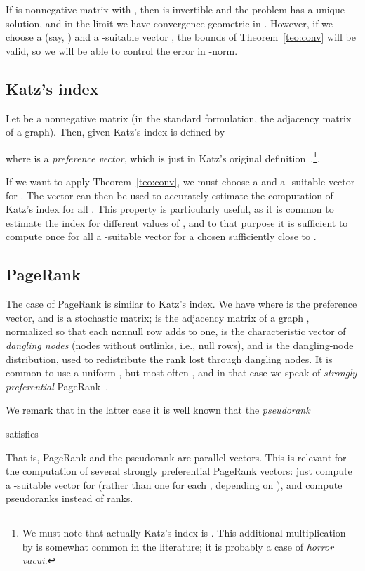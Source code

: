 \documentclass{article}
\newcommand{\1}{\mathbf 1}
\begin{document}
If  is nonnegative matrix with , then  is invertible and the 
problem  has a unique solution, and in the limit we have
convergence geometric in . However, if we choose a
 (say, ) and a -suitable vector , the bounds of
Theorem~\ref{teo:conv} will be valid, so we will be
able to control the error in -norm.

\subsection{Katz's index}

Let  be a nonnegative matrix (in the standard formulation, the adjacency
matrix of a graph). Then, given  Katz's index is defined by

where  is a \emph{preference vector}, which is just  in Katz's
original definition~\cite{KatNSIDSA}.\footnote{We must note that actually Katz's index is 
. This additional multiplication by
 is somewhat common in the literature; it is probably a case of
\textit{horror vacui}.}.

If we want to apply Theorem~\ref{teo:conv}, we must choose a 
and a -suitable vector  for . The vector can then be used to
accurately estimate the computation of Katz's index for all
. This property is particularly useful, as it is common to
estimate the index for different values of , and to that purpose it is
sufficient to compute once for all a -suitable vector for  
a  chosen sufficiently close to .

\subsection{PageRank} The case of PageRank is similar to Katz's index. We have
 where  is the preference vector, and
 is a stochastic matrix;  is the adjacency matrix
of a graph , normalized so that each nonnull row adds to one,  is the
characteristic vector of \emph{dangling nodes} (nodes without outlinks, i.e.,
null rows), and  is the dangling-node distribution, used to redistribute
the rank lost through dangling nodes. It is common to use a uniform , but
most often , and in that case we speak of \emph{strongly
preferential} PageRank~\cite{BSVPFD}.

We remark that in the latter case it is well known that the \emph{pseudorank}

satisfies

That is, PageRank and the pseudorank are parallel vectors. This is relevant for
the computation of several strongly preferential PageRank vectors: just
compute a -suitable vector for  (rather than
one for each , depending on ), and compute
pseudoranks instead of ranks.
\end{document}
